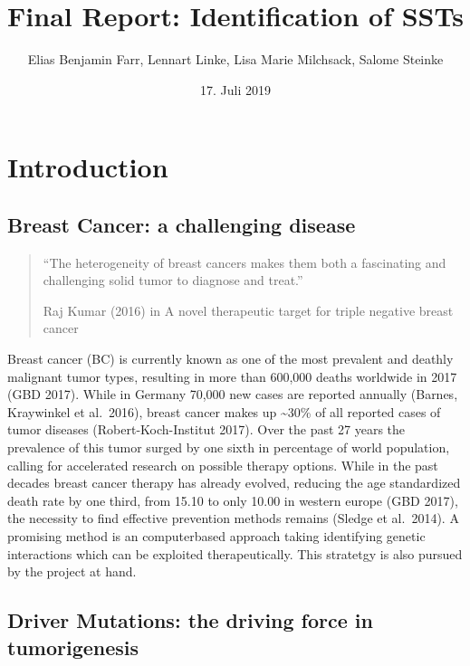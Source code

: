 \documentclass[]{article}
\title{Final Report: Identification of SSTs}
\author{Elias Benjamin Farr, Lennart Linke, Lisa Marie Milchsack, Salome Steinke}
\date{17. Juli 2019}
\begin{document}
\maketitle

{
\setcounter{tocdepth}{2}
\tableofcontents
}
\hypertarget{introduction}{%
\section{Introduction}\label{introduction}}

\hypertarget{breast-cancer-a-challenging-disease}{%
\subsection{Breast Cancer: a challenging
disease}\label{breast-cancer-a-challenging-disease}}

\begin{quote}
``The heterogeneity of breast cancers makes them both a fascinating and
challenging solid tumor to diagnose and treat.''

Raj Kumar (2016) in A novel therapeutic target for triple negative
breast cancer
\end{quote}

Breast cancer (BC) is currently known as one of the most prevalent and
deathly malignant tumor types, resulting in more than 600,000 deaths
worldwide in 2017 (GBD 2017). While in Germany 70,000 new cases are
reported annually (Barnes, Kraywinkel et al.~2016), breast cancer makes
up \textasciitilde30\% of all reported cases of tumor diseases
(Robert-Koch-Institut 2017). Over the past 27 years the prevalence of
this tumor surged by one sixth in percentage of world population,
calling for accelerated research on possible therapy options. While in
the past decades breast cancer therapy has already evolved, reducing the
age standardized death rate by one third, from 15.10 to only 10.00 in
western europe (GBD 2017), the necessity to find effective prevention
methods remains (Sledge et al.~2014). A promising method is an
computerbased approach taking identifying genetic interactions which can
be exploited therapeutically. This stratetgy is also pursued by the
project at hand.

\hypertarget{driver-mutations-the-driving-force-in-tumorigenesis}{%
\subsection{Driver Mutations: the driving force in
tumorigenesis}\label{driver-mutations-the-driving-force-in-tumorigenesis}}
\end{document}

